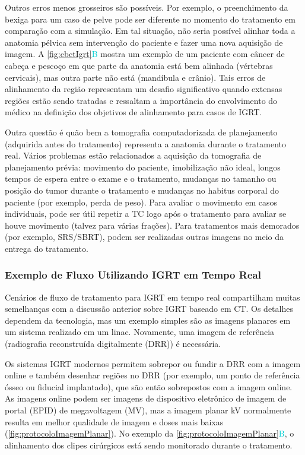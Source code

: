 \documentclass[11pt,a4paper]{article}
\newcounter{exemplo}
\begin{document}
	Outros erros menos grosseiros são possíveis. Por exemplo, o preenchimento da bexiga para um caso de pelve pode ser diferente no momento do tratamento em comparação com a simulação. Em tal situação, não seria possível alinhar toda a anatomia pélvica sem intervenção do paciente e fazer uma nova aquisição de imagem. A \ref{fig:cbctIgrt}\textcolor{DarkTurquoise}{B} mostra um exemplo de um paciente com câncer de cabeça e pescoço em que parte da anatomia está bem alinhada (vértebras cervicais), mas outra parte não está (mandíbula e crânio). Tais erros de alinhamento da região representam um desafio significativo quando extensas regiões estão sendo tratadas e ressaltam a importância do envolvimento do médico na definição dos objetivos de alinhamento para casos de IGRT. 

	Outra questão é quão bem a tomografia computadorizada de planejamento (adquirida antes do tratamento) representa a anatomia durante o tratamento real. Vários problemas estão relacionados a aquisição da tomografia de planejamento prévia: movimento do paciente, imobilização não ideal, longos tempos de espera entre o exame e o tratamento, mudanças no tamanho ou posição do tumor durante o tratamento e mudanças no habitus corporal do paciente (por exemplo, perda de peso). Para avaliar o movimento em casos individuais, pode ser útil repetir a TC logo após o tratamento para avaliar se houve movimento (talvez para várias frações). Para tratamentos mais demorados (por exemplo, SRS/SBRT), podem ser realizadas outras imagens no meio da entrega do tratamento. 

\subsubsection*{Exemplo de Fluxo Utilizando IGRT em Tempo Real}

	Cenários de fluxo de tratamento para IGRT em tempo real compartilham muitas semelhanças com a discussão anterior sobre IGRT baseado em CT. Os detalhes dependem da tecnologia, mas um exemplo simples são as imagens planares em um sistema realizado em um linac. Novamente, uma imagem de referência (radiografia reconstruída digitalmente (DRR)) é necessária. 

	Os sistemas IGRT modernos permitem sobrepor ou fundir a DRR com a imagem online e também desenhar regiões no DRR (por exemplo, um ponto de referência ósseo ou fiducial implantado), que são então sobrepostos com a imagem online. As imagens online podem ser imagens de dispositivo eletrônico de imagem de portal (EPID) de megavoltagem (MV), mas a imagem planar kV normalmente resulta em melhor qualidade de imagem e doses mais baixas (\ref{fig:protocoloImagemPlanar}). No exemplo da \ref{fig:protocoloImagemPlanar}\textcolor{DarkTurquoise}{B}, o alinhamento dos clipes cirúrgicos está sendo monitorado durante o tratamento.
\end{document}

